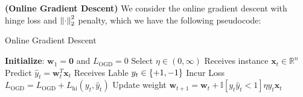 \begin{definition}{\textbf{(Online Gradient Descent)}}
    We consider the online gradient descent with hinge loss and $\left\lVert\cdot\right\rVert^2_2$ penalty, which we have the following pseudocode:
    \begin{algorithm}[H]
        \caption{Online Gradient Descent}
        \begin{algorithmic}[1]
            \State \textbf{Initialize}: $\boldsymbol w_1=\boldsymbol 0$ and $L_\text{OGD}=0$ 
            \State Select $\eta\in(0, \infty)$
                \State Receives instance $\boldsymbol x_t \in \mathbb{R}^n$
                \State Predict $\hat{y}_t = \boldsymbol w_t^T\boldsymbol x_t$
                \State Receives Lable $y_t \in \left\{ +1, -1 \right\}$
                \State Incur Loss $L_\text{OGD} = L_\text{OGD} + L_\text{hi}(y_t,\hat{y}_t)$
                \State Update weight $\boldsymbol w_{t+1} = \boldsymbol w_t + \mathbb{I}[y_t\hat{y}_t<1]\eta y_t\boldsymbol x_t$
            \EndFor
        \end{algorithmic} 
    \end{algorithm}
\end{definition}

